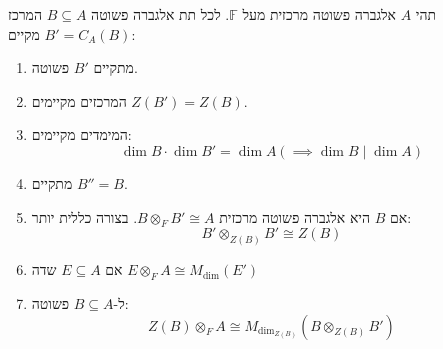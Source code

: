 \documentclass{tstextbook}
\begin{document}
\begin{theorem}[המרכז]
תהי \(A\) אלגברה פשוטה מרכזית  מעל \(\mathbb{F}\). לכל תת אלגברה פשוטה \(B\subseteq A\) המרכז \(B'=C_{A}(B)\) מקיים:

  \begin{enumerate}
    \item מתקיים \(B'\) פשוטה. 


    \item המרכזים מקיימים \(Z(B')=Z(B)\). 


    \item המימדים מקיימים: 
$$\dim  B\cdot \dim  B'=\dim  A(\implies \dim  B \mid  \dim  A)$$


    \item מתקיים \(B'' = B\). 


    \item אם \(B\) היא אלגברה פשוטה מרכזית \(B\otimes_{F}B' \cong A\). בצורה כללית יותר: 
$$B'\otimes_{Z(B)}B'\cong  Z(B)$$


    \item אם \(E\subseteq A\) שדה \(E\otimes_{F}A\cong M_{\text{dim}}(E')\)


    \item ל-\(B\subseteq A\) פשוטה: 
$$Z(B)\otimes_{F}A\cong M_{\text{dim}_{Z(B)}}(B\otimes_{Z(B)} B')$$


  \end{enumerate}
\end{theorem}
\end{document}
